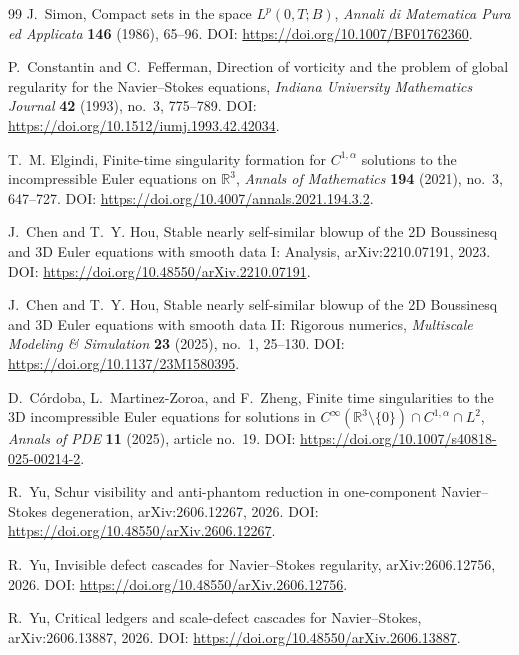 \documentclass[11pt]{article}
\numberwithin{equation}{section}
\theoremstyle{remark}
\begin{document}
\begin{thebibliography}{99}
J.~Simon,
\newblock Compact sets in the space $L^p(0,T;B)$,
\newblock \emph{Annali di Matematica Pura ed Applicata} \textbf{146} (1986), 65--96.
\newblock DOI: \url{https://doi.org/10.1007/BF01762360}.

P.~Constantin and C.~Fefferman,
\newblock Direction of vorticity and the problem of global regularity for the Navier--Stokes equations,
\newblock \emph{Indiana University Mathematics Journal} \textbf{42} (1993), no.~3, 775--789.
\newblock DOI: \url{https://doi.org/10.1512/iumj.1993.42.42034}.

T.~M. Elgindi,
\newblock Finite-time singularity formation for $C^{1,\alpha}$ solutions to the incompressible Euler equations on $\mathbb R^3$,
\newblock \emph{Annals of Mathematics} \textbf{194} (2021), no.~3, 647--727.
\newblock DOI: \url{https://doi.org/10.4007/annals.2021.194.3.2}.

J.~Chen and T.~Y. Hou,
\newblock Stable nearly self-similar blowup of the 2D Boussinesq and 3D Euler equations with smooth data I: Analysis,
\newblock arXiv:2210.07191, 2023.
\newblock DOI: \url{https://doi.org/10.48550/arXiv.2210.07191}.

J.~Chen and T.~Y. Hou,
\newblock Stable nearly self-similar blowup of the 2D Boussinesq and 3D Euler equations with smooth data II: Rigorous numerics,
\newblock \emph{Multiscale Modeling \& Simulation} \textbf{23} (2025), no.~1, 25--130.
\newblock DOI: \url{https://doi.org/10.1137/23M1580395}.

D.~C\'ordoba, L.~Martinez-Zoroa, and F.~Zheng,
\newblock Finite time singularities to the 3D incompressible Euler equations for solutions in $C^\infty(\mathbb R^3\setminus\{0\})\cap C^{1,\alpha}\cap L^2$,
\newblock \emph{Annals of PDE} \textbf{11} (2025), article no.~19.
\newblock DOI: \url{https://doi.org/10.1007/s40818-025-00214-2}.

R.~Yu,
\newblock Schur visibility and anti-phantom reduction in one-component Navier--Stokes degeneration,
\newblock arXiv:2606.12267, 2026.
\newblock DOI: \url{https://doi.org/10.48550/arXiv.2606.12267}.

R.~Yu,
\newblock Invisible defect cascades for Navier--Stokes regularity,
\newblock arXiv:2606.12756, 2026.
\newblock DOI: \url{https://doi.org/10.48550/arXiv.2606.12756}.

R.~Yu,
\newblock Critical ledgers and scale-defect cascades for Navier--Stokes,
\newblock arXiv:2606.13887, 2026.
\newblock DOI: \url{https://doi.org/10.48550/arXiv.2606.13887}.


\end{thebibliography}
\end{document}
